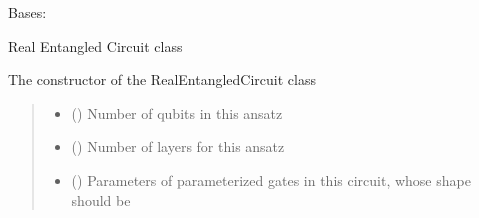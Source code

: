 \documentclass[letterpaper,10pt,english]{sphinxmanual}
\begin{document}
\begin{fulllineitems}
\begin{fulllineitems}
\begin{quote}
\begin{description}
\end{description}\end{quote}

\end{fulllineitems}


\end{fulllineitems}


\begin{fulllineitems}
\label{\detokenize{qcompute_qapp.circuit:qcompute_qapp.circuit.RealEntangledCircuit}}
\pysigstartsignatures
{}
\pysigstopsignatures
\sphinxAtStartPar
Bases: {\hyperref[\detokenize{qcompute_qapp.circuit:qcompute_qapp.circuit.ParameterizedCircuit}]{}}

\sphinxAtStartPar
Real Entangled Circuit class

\sphinxAtStartPar
The constructor of the RealEntangledCircuit class
\begin{quote}\begin{description}
\begin{itemize}
\item {} 
\sphinxAtStartPar
{} () \textendash{} Number of qubits in this ansatz

\item {} 
\sphinxAtStartPar
{} () \textendash{} Number of layers for this ansatz

\item {} 
\sphinxAtStartPar
{} () \textendash{} Parameters of parameterized gates in this circuit, whose shape
should be 

\end{itemize}


\end{description}
\end{quote}
\end{fulllineitems}
\end{document}
